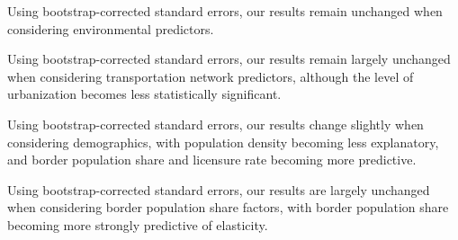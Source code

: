 \documentclass[12pt,a4paper]{article}
\begin{document}
\begin{table}[H]
	\begin{center}
		
		\label{environmental_estimates_w_boot}
		\caption[Bootstrap-Corrected Environmental Predictor Estimates, Weighted]{Using bootstrap-corrected standard errors, our results remain unchanged when considering environmental predictors.}
	\end{center}
\end{table}

\begin{table}[H]
	\begin{center}
		
		\label{transportation_estimates_w_boot}
		\caption[Bootstrap-Corrected Transportation Infrastructure Predictor Estimates, Weighted]{Using bootstrap-corrected standard errors, our results remain largely unchanged when considering transportation network predictors, although the level of urbanization becomes less statistically significant.}
	\end{center}
\end{table}

\begin{table}[H]
	\begin{center}
		
		\label{demographic_estimates_w_boot}
		\caption[Bootstrap-Corrected Demographic Predictor Estimates, Weighted]{Using bootstrap-corrected standard errors, our results change slightly when considering demographics, with population density becoming less explanatory, and border population share and licensure rate becoming more predictive.}
	\end{center}
\end{table}

\begin{table}[H]
	\begin{center}
		
		\label{pop_share_estimates_w_boot}
		\caption[Bootstrap-Corrected Cheaper Gas Border Predictor Estimates, Weighted]{Using bootstrap-corrected standard errors, our results are largely unchanged when considering border population share factors, with border population share becoming more strongly predictive of elasticity.}
	\end{center}
\end{table}
\end{document}
